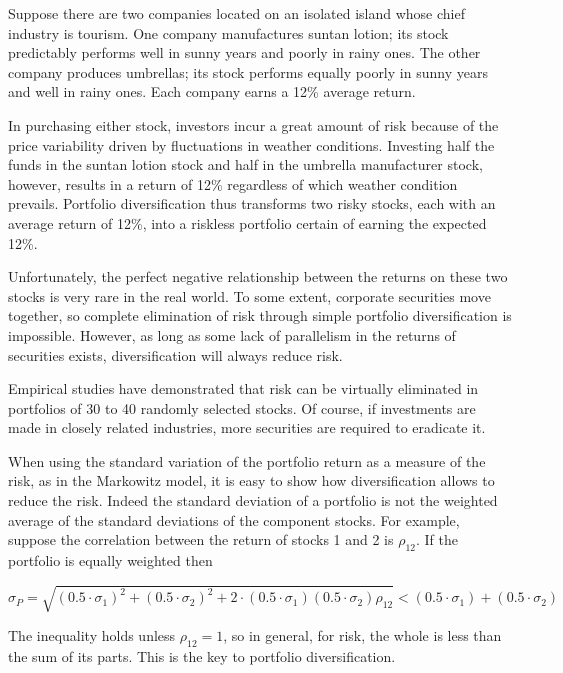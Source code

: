 Suppose there are two companies located on an isolated island whose chief industry is tourism. One company manufactures suntan lotion; its stock predictably performs well in sunny years and poorly in rainy ones. The other company produces umbrellas; its stock performs equally poorly in sunny years and well in rainy ones. Each company earns a 12\% average return.

In purchasing either stock, investors incur a great amount of risk because of the price variability driven by fluctuations in weather conditions. Investing half the funds in the suntan lotion stock and half in the umbrella manufacturer stock, however, results in a return of 12\% regardless of which weather condition prevails. Portfolio diversification thus transforms two risky stocks, each with an average return of 12\%, into a riskless portfolio certain of earning the expected 12\%.

Unfortunately, the perfect negative relationship between the returns on these two stocks is very rare in the real world. To some extent, corporate securities move together, so complete elimination of risk through simple portfolio diversification is impossible. However, as long as some lack of parallelism in the returns of securities exists, diversification will always reduce risk.

Empirical studies have demonstrated that risk can be virtually eliminated in portfolios of 30 to 40 randomly selected stocks. Of course, if investments are made in closely related industries, more securities are required to eradicate it.

When using the standard variation of the portfolio return as a measure of the risk, as in the Markowitz model, it is easy to show how diversification allows to reduce the risk. 
Indeed the standard deviation of a portfolio is not the weighted average of the standard deviations of the component stocks.
For example, suppose the correlation between the return of stocks 1 and 2 is $\rho_{12}$. If the portfolio is equally weighted then

\begin{equation}
\sigma_{P} = \sqrt{(0.5\cdot\sigma_1 )^2 + (0.5\cdot\sigma_2 )^2 + 2\cdot(0.5\cdot\sigma_1)(0.5\cdot\sigma_2)\rho_{12}} \lt (0.5\cdot\sigma_1 ) + (0.5\cdot\sigma_2 )
\end{equation}

The inequality holds unless $\rho_{12}=1$, so in general, for risk, the whole is less than the sum of its parts. 
This is the key to portfolio diversification.

